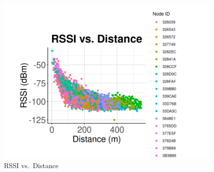 \documentclass[
]{book}
\begin{document}
\begin{figure}
\centering
\includegraphics{images/node_calibration_3.1_calculate_rssi_vs_distance.png}
\caption{RSSI vs.~Distance}
\end{figure}
\end{document}

